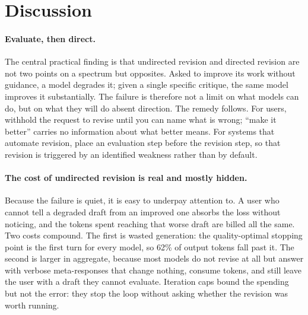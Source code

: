 \section{Discussion}

\paragraph{Evaluate, then direct.} The central practical finding is that undirected revision and directed revision are not two points on a spectrum but opposites. Asked to improve its work without guidance, a model degrades it; given a single specific critique, the same model improves it substantially. The failure is therefore not a limit on what models can do, but on what they will do absent direction. The remedy follows. For users, withhold the request to revise until you can name what is
wrong; ``make it better'' carries no information about what better means. For systems that
automate revision, place an evaluation step before the revision step, so that revision is
triggered by an identified weakness rather than by default.

\paragraph{The cost of undirected revision is real and mostly hidden.} Because the failure is quiet, it is easy to underpay attention to. A user who cannot tell
a degraded draft from an improved one absorbs the loss without noticing, and the tokens
spent reaching that worse draft are billed all the same. Two costs compound. The first is
wasted generation: the quality-optimal stopping point is the first turn for every model, so
62\% of output tokens fall past it. The second is larger in aggregate, because most models
do not revise at all but answer with verbose meta-responses that change nothing, consume
tokens, and still leave the user with a draft they cannot evaluate. Iteration caps bound
the spending but not the error: they stop the loop without asking whether the revision was
worth running.

